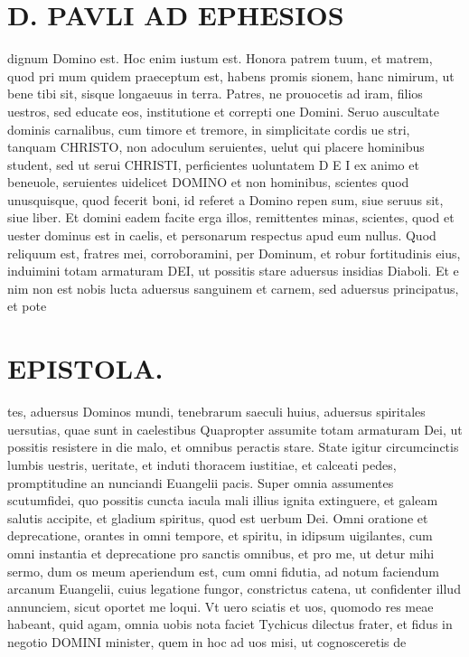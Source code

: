 \documentclass{article}
\begin{document}
\begin{pages}
\section*{D. PAVLI AD EPHESIOS }
\marginpar{[ p.2.  ]}
\marginpar{[ p.3.  ]}
\marginpar{[ p.4.  ]}
\marginpar{[ p.5.  ]}\pstart dignum Domino est. Hoc enim iustum est. Honora patrem tuum, et matrem, quod pri mum quidem praeceptum est, habens promis sionem, hanc nimirum, ut bene tibi sit, sisque longaeuus in terra.  \pend\pstart Patres, ne prouocetis ad iram, filios uestros, sed educate eos, institutione et correpti one Domini.  \pend\pstart Seruo auscultate dominis carnalibus, cum timore et tremore, in simplicitate cordis ue stri, tanquam CHRISTO, non adoculum seruientes, uelut qui placere hominibus student, sed ut serui CHRISTI, perficientes uoluntatem D E I ex animo et beneuole, seruientes uidelicet DOMINO et non hominibus, scientes quod unusquisque, quod fecerit boni, id referet a Domino repen sum, siue seruus sit, siue liber.  \pend\pstart Et domini eadem facite erga illos, remittentes minas, scientes, quod et uester dominus est in caelis, et personarum respectus apud eum nullus.  \pend\pstart Quod reliquum est, fratres mei, corroboramini, per Dominum, et robur fortitudinis eius, induimini totam armaturam DEI, ut possitis stare aduersus insidias Diaboli. Et e nim non est nobis lucta aduersus sanguinem et carnem, sed aduersus principatus, et pote\pend
\section*{EPISTOLA.  }
\marginpar{[ p.16 ]}
\marginpar{[ p.6.  ]}
\marginpar{[ p.7.  ]}
\marginpar{[ p.8.  ]}\pstart tes, aduersus Dominos mundi, tenebrarum saeculi huius, aduersus spiritales uersutias, quae sunt in caelestibus  \pend\pstart Quapropter assumite totam armaturam Dei, ut possitis resistere in die malo, et omnibus peractis stare. State igitur circumcinctis lumbis uestris, ueritate, et induti thoracem iustitiae, et calceati pedes, promptitudine an nunciandi Euangelii pacis. Super omnia assumentes scutumfidei, quo possitis cuncta iacula mali illius ignita extinguere, et galeam salutis accipite, et gladium spiritus, quod est uerbum Dei.  \pend\pstart Omni oratione et deprecatione, orantes in omni tempore, et spiritu, in idipsum uigilantes, cum omni instantia et deprecatione pro sanctis omnibus, et pro me, ut detur mihi sermo, dum os meum aperiendum est, cum omni fidutia, ad notum faciendum arcanum Euangelii, cuius legatione fungor, constrictus catena, ut confidenter illud annunciem, sicut oportet me loqui.  \pend\pstart Vt uero sciatis et uos, quomodo res meae habeant, quid agam, omnia uobis nota faciet Tychicus dilectus frater, et fidus in negotio DOMINI minister, quem in hoc ad uos misi, ut cognosceretis de  \pend

\end{pages}
\end{document}
